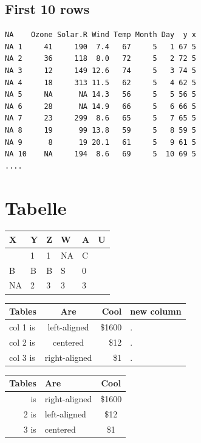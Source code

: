 \documentclass[
]{article}
\begin{document}
\hypertarget{first-10-rows}{%
\subsection{First 10 rows}\label{first-10-rows}}

\begin{verbatim}
NA    Ozone Solar.R Wind Temp Month Day  y x
NA 1     41     190  7.4   67     5   1 67 5
NA 2     36     118  8.0   72     5   2 72 5
NA 3     12     149 12.6   74     5   3 74 5
NA 4     18     313 11.5   62     5   4 62 5
NA 5     NA      NA 14.3   56     5   5 56 5
NA 6     28      NA 14.9   66     5   6 66 5
NA 7     23     299  8.6   65     5   7 65 5
NA 8     19      99 13.8   59     5   8 59 5
NA 9      8      19 20.1   61     5   9 61 5
NA 10    NA     194  8.6   69     5  10 69 5
....
\end{verbatim}

\hypertarget{tabelle}{%
\section{Tabelle}\label{tabelle}}

\begin{longtable}[]{@{}llllll@{}}
\toprule\noalign{}
X & Y & Z & W & A & U \\
\midrule\noalign{}
\endhead
\bottomrule\noalign{}
\endlastfoot
1 & 1 & 1 & NA & C & \\
B & B & B & S & 0 & \\
NA & 2 & 3 & 3 & 3 & \\
\end{longtable}

\begin{longtable}[]{@{}lcrl@{}}
\toprule\noalign{}
Tables & Are & Cool & new column \\
\midrule\noalign{}
\endhead
\bottomrule\noalign{}
\endlastfoot
col 1 is & left-aligned & \$1600 & . \\
col 2 is & centered & \$12 & . \\
col 3 is & right-aligned & \$1 & . \\
\end{longtable}

\begin{longtable}[]{@{}rlc@{}}
\toprule\noalign{}
Tables & Are & Cool \\
\midrule\noalign{}
\endhead
\bottomrule\noalign{}
\endlastfoot
1 is & right-aligned & \$1600 \\
2 is & left-aligned & \$12 \\
3 is & centered & \$1 \\
\end{longtable}
\end{document}
